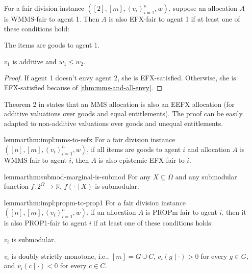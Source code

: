 \begin{lemma}[MMS$\implies$EFX for $n=2$]
\label{thm:impl:mms-to-efx-n2}
For a fair division instance $([2], [m], (v_i)_{i=1}^n, w)$,
suppose an allocation $A$ is WMMS-fair to agent 1.
Then $A$ is also EFX-fair to agent 1 if at least one of these conditions hold:
\begin{tightenum}
\item The items are goods to agent 1.
\item $v_1$ is additive and $w_1 \le w_2$.
\end{tightenum}
\end{lemma}
\begin{proof}
If agent 1 doesn't envy agent 2, she is EFX-satisfied.
Otherwise, she is EFX-satisfied because of \cref{thm:mms-and-all-envy}.
\end{proof}

Theorem 2 in \cite{caragiannis2023new} states that an MMS allocation is also an EEFX allocation
(for additive valuations over goods and equal entitlements).
The proof can be easily adapted to non-additive valuations over goods and unequal entitlements.

\begin{restatable}{lemma}{rthm:impl:mms-to-eefx}
\label{thm:impl:mms-to-eefx}
For a fair division instance $([n], [m], (v_i)_{i=1}^n, w)$,
if all items are goods to agent $i$ and allocation $A$ is WMMS-fair to agent $i$,
then $A$ is also epistemic-EFX-fair to $i$.
\end{restatable}

\begin{restatable}{lemma}{rthm:submod-marginal-is-submod}
\label{thm:submod-marginal-is-submod}
For any $X \subseteq \Omega$ and any submodular function $f: 2^{\Omega} \to \mathbb{R}$,
$f(\cdot \mid X)$ is submodular.
\end{restatable}

\begin{restatable}{lemma}{rthm:impl:propm-to-prop1}
\label{thm:impl:propm-to-prop1}
For a fair division instance $([n], [m], (v_i)_{i=1}^n, w)$,
if an allocation $A$ is PROPm-fair to agent $i$, then it is also PROP1-fair to agent $i$
if at least one of these conditions holds:
\begin{tightenum}
\item $v_i$ is submodular.
\item $v_i$ is doubly strictly monotone, i.e., $[m] = G \cup C$, $v_i(g \mid \cdot) > 0$
    for every $g \in G$, and $v_i(c \mid \cdot) < 0$ for every $c \in C$.
\end{tightenum}
\end{restatable}

